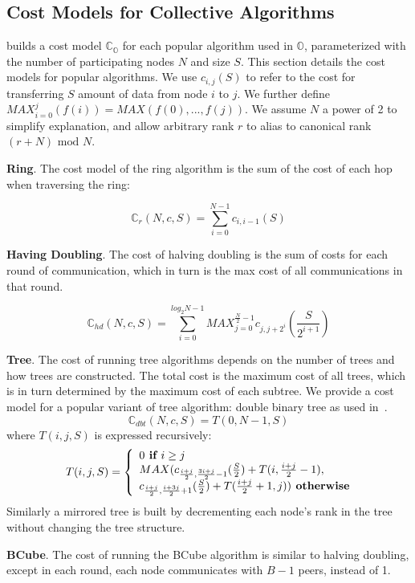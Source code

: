 \subsection{Cost Models for Collective Algorithms}
\cmpi builds a cost model $\mathbb{C}_\mathbb{O}$ for each popular algorithm used in \mpi $\mathbb{O}$, parameterized with the number of participating nodes $N$ and size $S$. This section details the cost models for popular algorithms. We use $c_{i,j}(S)$ to refer to the cost for transferring $S$ amount of data from node $i$ to $j$. We further define $MAX_{i=0}^{j}(f(i)) = MAX(f(0),...,f(j))$. We assume $N$ a power of 2 to simplify explanation, and allow arbitrary rank $r$ to alias to canonical rank $(r + N) \text{ mod } N$.
 
\noindent\textbf{Ring}. The cost model of the ring algorithm is the sum of the cost of each hop when traversing the ring: 

$$\mathbb{C}_{r}(N, c, S) = \sum_{i=0}^{N-1} c_{i,i-1}(S)$$

\noindent\textbf{Having Doubling}. The cost of halving doubling is the sum of costs for each round of communication, which in turn is the max cost of all communications in that round. 

$$\mathbb{C}_{hd}(N, c, S) = \sum_{i=0}^{log_2N-1}MAX_{j=0}^{\frac{N}{2}-1}c_{j,j+2^i}(\frac{S}{2^{i+1}}) $$

\noindent\textbf{Tree}. The cost of running tree algorithms depends on the number of trees and how trees are constructed. The total cost is the maximum cost of all trees, which is in turn determined by the maximum cost of each subtree. We provide a cost model for a popular variant of tree algorithm: double binary tree as used in~\cite{nccl}.
$$\mathbb{C}_{dbt}(N, c, S) = T(0,N-1,S)$$
where $T(i,j,S)$ is expressed recursively: 
\begin{align*}
 T(i,j,S) = 
 \left\lbrace
\begin{array}{l@{}l}
0 \textbf{ if $i \ge j$}\\
MAX(c_{\frac{i+j}{2}, \frac{3i+j}{2}-1}(\frac{S}{2}) + T(i, \frac{i+j}{2}-1), \\
c_{\frac{i+j}{2}, \frac{i+3j}{2}+1}(\frac{S}{2}) + T(\frac{i+j}{2}+1, j)) \textbf{ otherwise}
\end{array}
\right.
\end{align*}
Similarly a mirrored tree is built by decrementing each node's rank in the tree without changing the tree structure.

\noindent\textbf{BCube}. The cost of running the BCube algorithm is similar to halving doubling, except in each round, each node communicates with $B-1$ peers, instead of 1.

